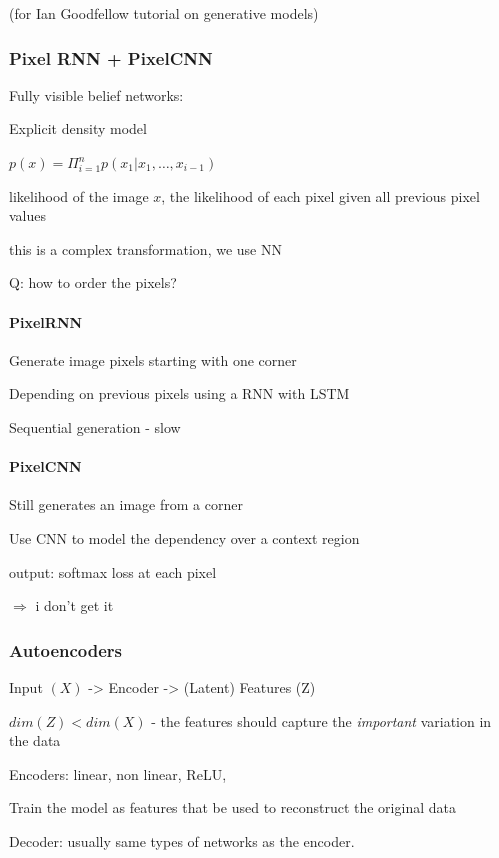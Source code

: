 (for Ian Goodfellow tutorial on generative models)

\subsubsection{Pixel RNN + PixelCNN}

Fully visible belief networks:

Explicit density model

$p(x) = \Pi_{i=1}^n p(x_1 | x_1,\dots, x_{i-1})$ 

likelihood of the image $x$, the likelihood of each pixel given all previous pixel values

this is a complex transformation, we use NN 

Q: how to order the pixels?

\paragraph{PixelRNN}

Generate image pixels starting with one corner

Depending on previous pixels using a RNN with LSTM

Sequential generation - slow

\paragraph{PixelCNN}

Still generates an image from a corner

Use CNN to model the dependency over a context region

output: softmax loss at each pixel

$\Rightarrow$ i don't get it



\subsubsection{Autoencoders}

Input $(X)$ -> Encoder -> (Latent) Features (Z)

$dim(Z) < dim(X)$ - the features should capture the \emph{important} variation in the data

Encoders: linear, non linear, ReLU, 

Train the model as features that be used to reconstruct the original data

Decoder: usually same types of networks as the encoder.

